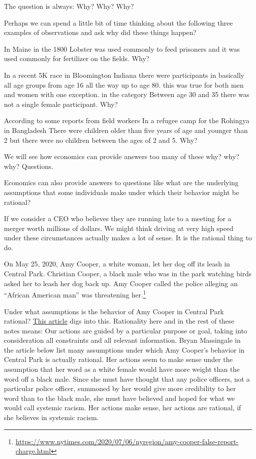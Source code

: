 \documentclass[
]{book}
\begin{document}
The question is always:
Why? Why? Why?

Perhaps we can spend a little bit of time thinking about the following three examples of observations and ask why did these things happen?

In Maine in the 1800 Lobster was used commonly to feed prisoners and it was used commonly for fertilizer on the fields. Why?

In a recent 5K race in Bloomington Indiana there were participants in basically all age groups from age 16 all the way up to age 80. this was true for both men and women with one exception. in the category Between age 30 and 35 there was not a single female participant. Why?

According to some reports from field workers In a refugee camp for the Rohingya in Bangladesh There were children older than five years of age and younger than 2 but there were no children between the ages of 2 and 5. Why?

We will see how economics can provide answers too many of these why? why? why? Questions.

Economics can also provide answers to questions like what are the underlying assumptions that some individuals make under which their behavior might be rational?

If we consider a CEO who believes they are running late to a meeting for a merger worth millions of dollars. We might think driving at very high speed under these circumstances actually makes a lot of sense. It is the rational thing to do.

On May 25, 2020, Amy Cooper, a white woman, let her dog off its leash in Central Park. Christian Cooper, a black male who was in the park watching birds asked her to leash her dog back up. Amy Cooper called the police alleging an ``African American man'' was threatening her.\footnote{\url{https://www.nytimes.com/2020/07/06/nyregion/amy-cooper-false-report-charge.html}}

Under what assumptions is the behavior of Amy Cooper in Central Park rational? \href{https://www.ncronline.org/news/opinion/assumptions-white-privilege-and-what-we-can-do-about-it}{This article} digs into this. Rationality here and in the rest of these notes means: Our actions are guided by a particular purpose or goal, taking into consideration all constraints and all relevant information. Bryan Massingale in the article below list many assumptions under which Amy Cooper's behavior in Central Park is actually rational. Her actions seem to make sense under the assumption that her word as a white female would have more weight than the word off a black male. Since she must have thought that any police officers, not a particular police officer, summoned by her would give more credibility to her word than to the black male, she must have believed and hoped for what we would call systemic racism. Her actions make sense, her actions are rational, if she believes in systemic racism.
\end{document}
